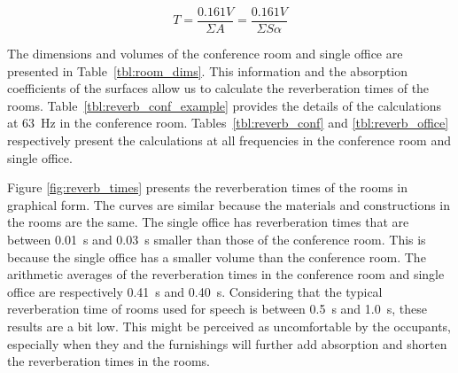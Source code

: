     \begin{equation}\label{eq:reverb}
		T = \frac{0.161 V}{\Sigma A} = \frac{0.161 V}{\Sigma S \alpha}
	\end{equation}

The dimensions and volumes of the conference room and single office are presented in Table~\ref{tbl:room_dims}.
This information and the absorption coefficients of the surfaces allow us to calculate the reverberation times of the rooms.
Table~\ref{tbl:reverb_conf_example} provides the details of the calculations at 63~Hz in the conference room.
Tables~\ref{tbl:reverb_conf} and \ref{tbl:reverb_office} respectively present the calculations at all frequencies in the conference room and single office.

Figure \ref{fig:reverb_times} presents the reverberation times of the rooms in graphical form.
The curves are similar because the materials and constructions in the rooms are the same.
The single office has reverberation times that are between 0.01~s and 0.03~s smaller than those of the conference room.
This is because the single office has a smaller volume than the conference room.
The arithmetic averages of the reverberation times in the conference room and single office are respectively 0.41~s and 0.40~s.
Considering that the typical reverberation time of rooms used for speech is between 0.5~s and 1.0~s, these results are a bit low.
This might be perceived as uncomfortable by the occupants, especially when they and the furnishings will further add absorption and shorten the reverberation times in the rooms.









